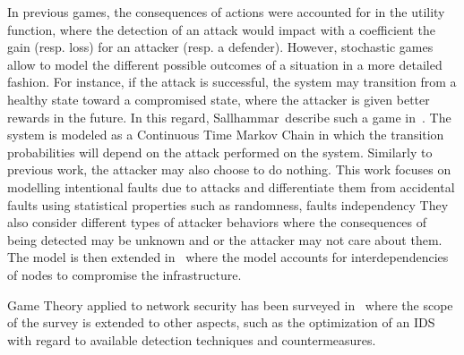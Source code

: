 In previous games, the consequences of actions were accounted for in the utility function, where the detection of an attack would impact with a coefficient the gain (resp. loss) for an attacker (resp. a defender).
However, stochastic games allow to model the different possible outcomes of a situation in a more detailed fashion.
For instance, if the attack is successful, the system may transition from a healthy state toward a compromised state, where the attacker is given better rewards in the future.
In this regard, Sallhammar~\etal describe such a game in~\cite{sallhammar2005}.
The system is modeled as a Continuous Time Markov Chain in which the transition probabilities will depend on the attack performed on the system. Similarly to previous work, the attacker may also choose to do nothing.
This work focuses on modelling intentional faults due to attacks and differentiate them from accidental faults using statistical properties such as randomness, faults independency \etc
They also consider different types of attacker behaviors where the consequences of being detected may be unknown and or the attacker may not care about them.
The model is then extended in~\cite{Nguyen2009} where the model accounts for interdependencies of nodes to compromise the infrastructure.

Game Theory applied to network security has been surveyed in~\cite{Roy2010,Kiennert2018} where the scope of the survey is extended to other aspects, such as the optimization of an IDS with regard to available detection techniques and countermeasures.
 
